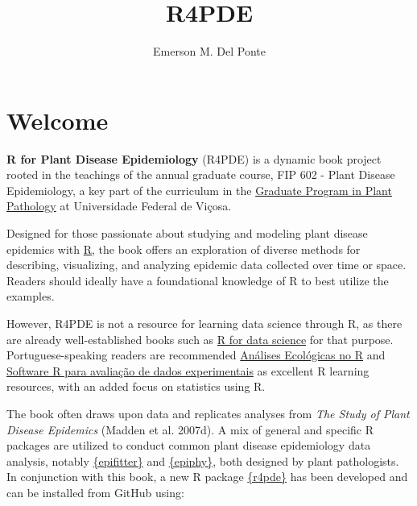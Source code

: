 \documentclass[
  letterpaper,
]{book}
\title{R4PDE}
\author{Emerson M. Del Ponte}
\date{}
\renewcommand*\contentsname{Table of contents}
\newcommand\contentsname{Table of contents}
\begin{document}
\frontmatter
\maketitle
\ifdefined\Shaded\renewenvironment{Shaded}{\begin{tcolorbox}[interior hidden, sharp corners, enhanced, boxrule=0pt, breakable, borderline west={3pt}{0pt}{shadecolor}, frame hidden]}{\end{tcolorbox}}\fi

\renewcommand*\contentsname{Table of contents}
{
\hypersetup{linkcolor=}
\setcounter{tocdepth}{2}
\tableofcontents
}
\mainmatter
{}

\hypertarget{welcome}{%
\chapter*{Welcome}\label{welcome}}


\textbf{R for Plant Disease Epidemiology} (R4PDE) is a dynamic book
project rooted in the teachings of the annual graduate course, FIP 602 -
Plant Disease Epidemiology, a key part of the curriculum in the
\href{http://www.dfp.ufv.br/grad/}{Graduate Program in Plant Pathology}
at Universidade Federal de Viçosa.

Designed for those passionate about studying and modeling plant disease
epidemics with \href{https://www.r-project.org/}{R}, the book offers an
exploration of diverse methods for describing, visualizing, and
analyzing epidemic data collected over time or space. Readers should
ideally have a foundational knowledge of R to best utilize the examples.

However, R4PDE is not a resource for learning data science through R, as
there are already well-established books such as
\href{https://r4ds.had.co.nz/}{R for data science} for that purpose.
Portuguese-speaking readers are recommended
\href{https://analises-ecologicas.netlify.app/}{Análises Ecológicas no
R} and \href{https://tiagoolivoto.github.io/e-bookr/index.html}{Software
R para avaliação de dados experimentais} as excellent R learning
resources, with an added focus on statistics using R.

The book often draws upon data and replicates analyses from \emph{The
Study of Plant Disease Epidemics} (Madden et al. 2007d). A mix of
general and specific R packages are utilized to conduct common plant
disease epidemiology data analysis, notably
\href{https://alvesks.github.io/epifitter/}{\{epifitter\}} and
\href{https://chgigot.github.io/epiphy/}{\{epiphy\}}, both designed by
plant pathologists. In conjunction with this book, a new R package
\href{https://github.com/emdelponte/r4pde}{\{r4pde\}} has been developed
and can be installed from GitHub using:
\end{document}
